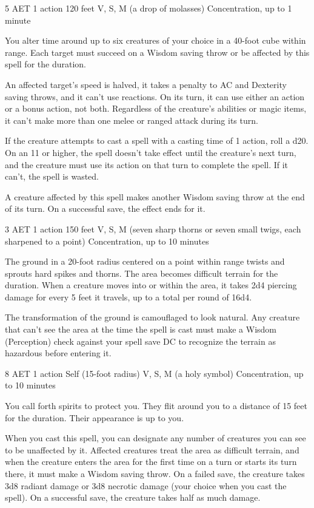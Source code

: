 \label{spell:slow}
{5 AET}
{1 action}
{120 feet}
{V, S, M (a drop of molasses)}
{Concentration, up to 1 minute}

You alter time around up to six creatures of your choice in a 40-foot cube within range. Each target must succeed on a Wisdom saving throw or be affected by this spell for the duration.

An affected target's speed is halved, it takes a  penalty to AC and Dexterity saving throws, and it can't use reactions. On its turn, it can use either an action or a bonus action, not both. Regardless of the creature's abilities or magic items, it can't make more than one melee or ranged attack during its turn.

If the creature attempts to cast a spell with a casting time of 1 action, roll a d20. On an 11 or higher, the spell doesn't take effect until the creature's next turn, and the creature must use its action on that turn to complete the spell. If it can't, the spell is wasted.

A creature affected by this spell makes another Wisdom saving throw at the end of its turn. On a successful save, the effect ends for it.

\label{spell:spike-growth}
{3 AET}
{1 action}
{150 feet}
{V, S, M (seven sharp thorns or seven small twigs, each sharpened to a point)}
{Concentration, up to 10 minutes}

The ground in a 20-foot radius centered on a point within range twists and sprouts hard spikes and thorns. The area becomes difficult terrain for the duration. When a creature moves into or within the area, it takes 2d4 piercing damage for every 5 feet it travels, up to a total per round of 16d4.

The transformation of the ground is camouflaged to look natural. Any creature that can't see the area at the time the spell is cast must make a Wisdom (Perception) check against your spell save DC to recognize the terrain as hazardous before entering it.

\label{spell:spirit-guardians}
{8 AET}
{1 action}
{Self (15-foot radius)}
{V, S, M (a holy symbol)}
{Concentration, up to 10 minutes}

You call forth spirits to protect you. They flit around you to a distance of 15 feet for the duration. Their appearance is up to you.

When you cast this spell, you can designate any number of creatures you can see to be unaffected by it. Affected creatures treat the area as difficult terrain, and when the creature enters the area for the first time on a turn or starts its turn there, it must make a Wisdom saving throw. On a failed save, the creature takes 3d8 radiant damage or 3d8 necrotic damage (your choice when you cast the spell). On a successful save, the creature takes half as much damage.


